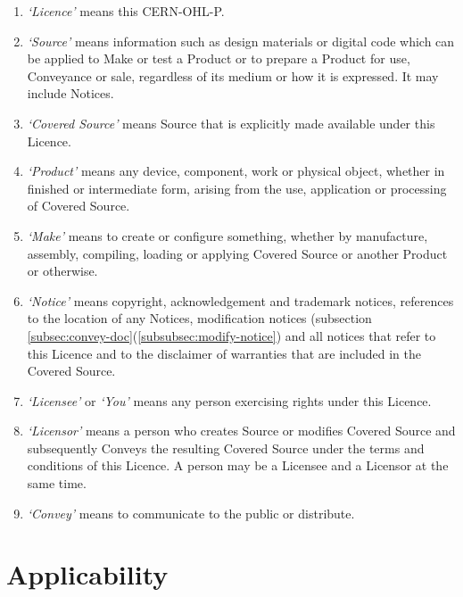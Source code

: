\documentclass[10pt, a4paper]{article}
\begin{document}
\begin{enumerate}[label=\ref*{sec:definitions}.\arabic*]

\item \emph{`Licence'} means this CERN-OHL-P. 

\item \emph{`Source'} means information such as design materials or digital code which can be applied to Make or test a Product or to prepare a Product for use, Conveyance or sale, regardless of its medium or how it is expressed. It may include  Notices.  

\item \emph{`Covered Source'} means Source that is explicitly made available under this Licence.

\item \emph{`Product'} means any device, component, work or physical object, whether in finished or intermediate form, arising from the use, application or processing of Covered Source. 

\item \emph{`Make'} means to create or configure something, whether by manufacture, assembly, compiling, loading or applying Covered Source or another Product or otherwise.

\item \emph{`Notice'} means copyright, acknowledgement and trademark notices, references to the location of any Notices, modification notices (subsection \ref*{subsec:convey-doc}(\ref*{subsubsec:modify-notice}) and all notices that refer to this Licence and to the disclaimer of warranties that are included in the Covered Source.

\item \emph{`Licensee'} or \emph{`You'}  means any person exercising rights under this Licence.

\item \emph{`Licensor'} means a person who creates Source or modifies Covered Source and subsequently Conveys the resulting Covered Source under the terms and conditions of this Licence. A person may be a Licensee and a Licensor at the same time.

\item \emph{`Convey'} means to communicate to the public or distribute.

\end{enumerate}

\section{Applicability}
\label{sec:applicability}
\end{document}
